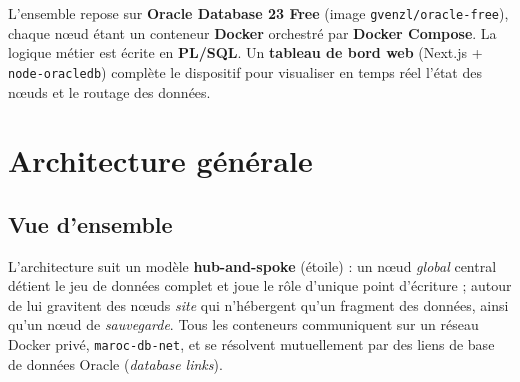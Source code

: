 \documentclass[11pt,a4paper]{article}
\begin{document}
L'ensemble repose sur \textbf{Oracle Database 23 Free} (image
\texttt{gvenzl/oracle-free}), chaque nœud étant un conteneur \textbf{Docker}
orchestré par \textbf{Docker Compose}. La logique métier est écrite en
\textbf{PL/SQL}. Un \textbf{tableau de bord web} (Next.js + \texttt{node-oracledb})
complète le dispositif pour visualiser en temps réel l'état des nœuds et le
routage des données.

\section{Architecture générale}

\subsection{Vue d'ensemble}

L'architecture suit un modèle \textbf{hub-and-spoke} (étoile) : un nœud
\emph{global} central détient le jeu de données complet et joue le rôle
d'unique point d'écriture ; autour de lui gravitent des nœuds \emph{site} qui
n'hébergent qu'un fragment des données, ainsi qu'un nœud de \emph{sauvegarde}.
Tous les conteneurs communiquent sur un réseau Docker privé,
\texttt{maroc-db-net}, et se résolvent mutuellement par des liens de base de
données Oracle (\emph{database links}).
\end{document}
